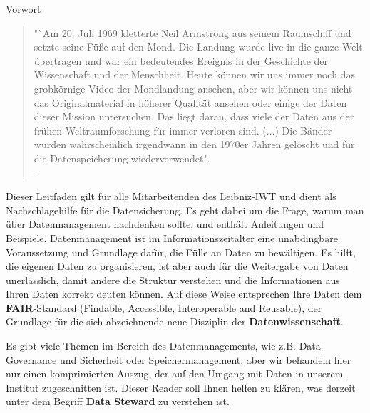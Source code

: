 \thispagestyle{empty}
\begin{center}
  \large\headerfont{}\textcolor{iwtdark}{Vorwort}
\end{center}

\begin{quote}
  "`Am 20. Juli 1969 kletterte Neil Armstrong aus seinem Raumschiff und setzte
  seine Füße auf den Mond. Die Landung wurde live in die ganze Welt übertragen
  und war ein bedeutendes Ereignis in der Geschichte der Wissenschaft und der
  Menschheit. Heute können wir uns immer noch das grobkörnige Video der
  Mondlandung ansehen, aber wir können uns nicht das Originalmaterial in höherer
  Qualität ansehen oder einige der Daten dieser Mission untersuchen. Das
  liegt daran, dass viele der Daten aus der frühen Weltraumforschung für immer
  verloren sind. ($\ldots$) Die Bänder wurden wahrscheinlich irgendwann in den 1970er
  Jahren gelöscht und für die Datenspeicherung wiederverwendet". \\
  \null\hfill - \citeauthor{briney2015}\cite{briney2015}
\end{quote}

\noindent Dieser Leitfaden gilt für alle Mitarbeitenden des Leibniz-IWT und
dient als Nachschlagehilfe für die Datensicherung. Es geht dabei um die Frage,
warum man über Datenmanagement nachdenken sollte, und enthält Anleitungen und
Beispiele. Datenmanagement ist im Informationszeitalter eine unabdingbare
Voraussetzung und Grundlage dafür, die Fülle an Daten zu bewältigen. Es hilft,
die eigenen Daten zu organisieren, ist aber auch für die Weitergabe von Daten
unerlässlich, damit andere die Struktur verstehen und die Informationen aus
Ihren Daten korrekt deuten können. Auf diese Weise entsprechen Ihre Daten dem
\textbf{FAIR}-Standard (Findable, Accessible, Interoperable and Reusable), der
Grundlage für die sich abzeichnende neue Disziplin der
\textbf{Datenwissenschaft}.

Es gibt viele Themen im Bereich des Datenmanagements, wie z.B. Data Governance
und Sicherheit oder Speichermanagement, aber wir behandeln hier nur einen
komprimierten Auszug, der auf den Umgang mit Daten in unserem Institut
zugeschnitten ist. Dieser Reader soll Ihnen helfen zu klären, was derzeit unter dem Begriff \textbf{Data Steward} zu verstehen ist.
